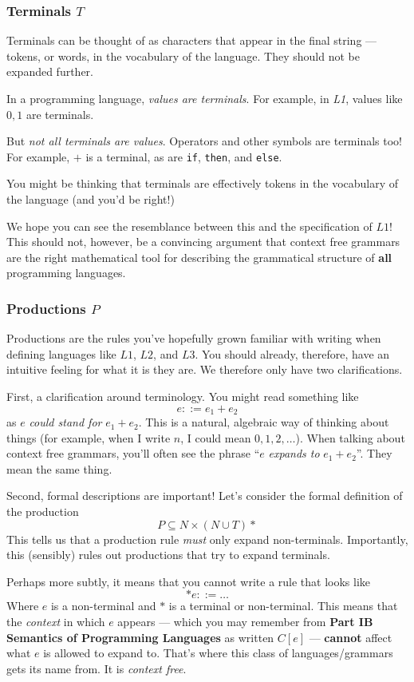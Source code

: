 \subsubsection{Terminals $T$}
Terminals can be thought of as characters that appear in the final string --- tokens, or words, in the vocabulary of the language. They should not be expanded further.

In a programming language, \textit{values are terminals}. For example, in \textit{L1}, values like $0, 1$ are terminals. 

But \textit{not all terminals are values}. Operators and other symbols are terminals too! For example, $+$ is a terminal, as are \texttt{if}, \texttt{then}, and \texttt{else}.

You might be thinking that terminals are effectively tokens in the vocabulary of the language (and you'd be right!)

We hope you can see the resemblance between this and the specification of $L1$! This should not, however, be a convincing argument that context free grammars are the right mathematical tool for describing the grammatical structure of \textbf{all} programming languages. 

\subsubsection{Productions $P$}
Productions are the rules you've hopefully grown familiar with writing when defining languages like $L1$, $L2$, and $L3$. You should already, therefore, have an intuitive feeling for what it is they are. We therefore only have two clarifications.

First, a clarification around terminology. You might read something like
\[ e ::= e_1 + e_2 \] 
as $e$ \textit{could stand for} $e_1 + e_2$. This is a natural, algebraic way of thinking about things (for example, when I write $n$, I could mean $0, 1, 2, \ldots$). When talking about context free grammars, you'll often see the phrase ``$e$ \textit{expands to} $e_1 + e_2$''. They mean the same thing.

Second, formal descriptions are important! Let's consider the formal definition of the production
\[P \subseteq N \times (N \cup T)*\]
This tells us that a production rule \textit{must} only expand non-terminals. Importantly, this (sensibly) rules out productions that try to expand terminals.

Perhaps more subtly, it means that you cannot write a rule that looks like 
\[*e ::= \ldots\]
Where $e$ is a non-terminal and $*$ is a terminal or non-terminal. This means that the \textit{context} in which $e$ appears --- which you may remember from \textbf\textsf{Part IB Semantics of Programming Languages} as written $C[e]$ --- \textbf{cannot} affect what $e$ is allowed to expand to. That's where this class of languages/grammars gets its name from. It is \textit{context free}. 

